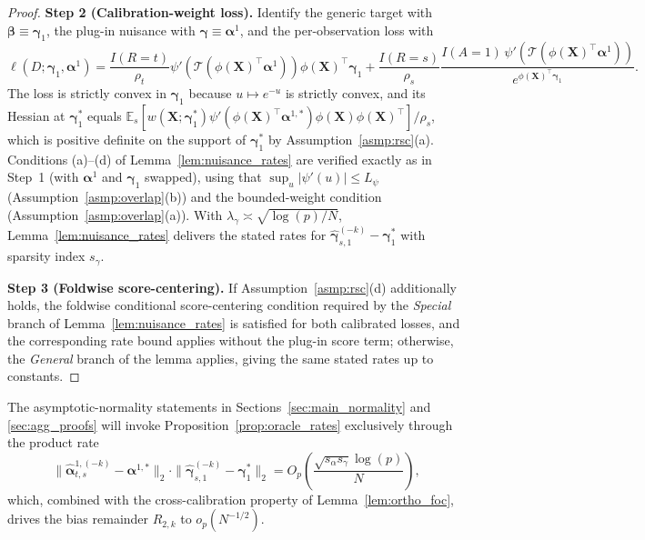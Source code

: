 \documentclass{article}
\begin{document}
\begin{proof}
\textbf{Step 2 (Calibration-weight loss).}
Identify the generic target with $\boldsymbol{\beta}\equiv\boldsymbol{\gamma}_1$, the plug-in nuisance with $\boldsymbol{\gamma}\equiv\boldsymbol{\alpha}^1$, and the per-observation loss with
\[
\ell(D;\boldsymbol{\gamma}_1,\boldsymbol{\alpha}^1)=\frac{I(R=t)}{\rho_t}\psi'\!\left(\mathcal{T}(\phi(\boldsymbol{X})^\top\boldsymbol{\alpha}^1)\right)\phi(\boldsymbol{X})^\top\boldsymbol{\gamma}_1+\frac{I(R=s)}{\rho_s}\frac{I(A=1)\,\psi'\!\left(\mathcal{T}(\phi(\boldsymbol{X})^\top\boldsymbol{\alpha}^1)\right)}{e^{\phi(\boldsymbol{X})^\top\boldsymbol{\gamma}_1}}.
\]
The loss is strictly convex in $\boldsymbol{\gamma}_1$ because $u\mapsto e^{-u}$ is strictly convex, and its Hessian at $\boldsymbol{\gamma}_1^*$ equals $\mathbb{E}_s[w(\boldsymbol{X};\boldsymbol{\gamma}_1^*)\psi'(\phi(\boldsymbol{X})^\top\boldsymbol{\alpha}^{1,*})\phi(\boldsymbol{X})\phi(\boldsymbol{X})^\top]/\rho_s$, which is positive definite on the support of $\boldsymbol{\gamma}_1^*$ by Assumption~\ref{asmp:rsc}(a). Conditions (a)--(d) of Lemma~\ref{lem:nuisance_rates} are verified exactly as in Step~1 (with $\boldsymbol{\alpha}^1$ and $\boldsymbol{\gamma}_1$ swapped), using that $\sup_u|\psi'(u)|\le L_\psi$ (Assumption~\ref{asmp:overlap}(b)) and the bounded-weight condition (Assumption~\ref{asmp:overlap}(a)). With $\lambda_\gamma\asymp\sqrt{\log(p)/N}$, Lemma~\ref{lem:nuisance_rates} delivers the stated rates for $\widehat{\boldsymbol{\gamma}}_{s,1}^{(-k)}-\boldsymbol{\gamma}_1^*$ with sparsity index $s_\gamma$.

\textbf{Step 3 (Foldwise score-centering).}
If Assumption~\ref{asmp:rsc}(d) additionally holds, the foldwise conditional score-centering condition required by the \emph{Special} branch of Lemma~\ref{lem:nuisance_rates} is satisfied for both calibrated losses, and the corresponding rate bound applies without the plug-in score term; otherwise, the \emph{General} branch of the lemma applies, giving the same stated rates up to constants.
\end{proof}

The asymptotic-normality statements in Sections~\ref{sec:main_normality} and \ref{sec:agg_proofs} will invoke Proposition~\ref{prop:oracle_rates} exclusively through the product rate
\[
\|\widehat{\boldsymbol{\alpha}}_{t,s}^{1,(-k)}-\boldsymbol{\alpha}^{1,*}\|_2\cdot\|\widehat{\boldsymbol{\gamma}}_{s,1}^{(-k)}-\boldsymbol{\gamma}_1^*\|_2 = O_p\!\left(\frac{\sqrt{s_\alpha s_\gamma}\log(p)}{N}\right),
\]
which, combined with the cross-calibration property of Lemma~\ref{lem:ortho_foc}, drives the bias remainder $R_{2,k}$ to $o_p(N^{-1/2})$.
\end{document}
